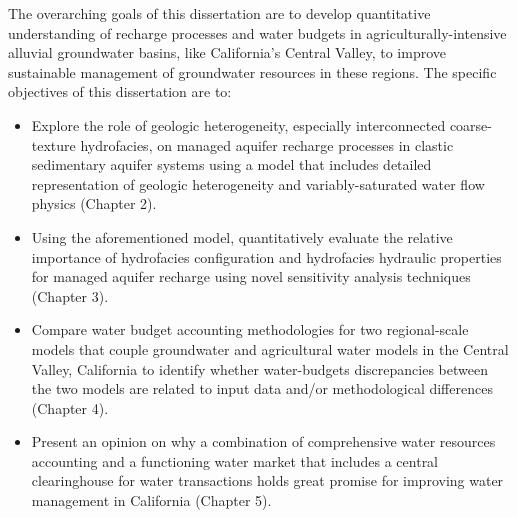 The overarching goals of this dissertation are to develop quantitative understanding of recharge processes and water budgets in agriculturally-intensive alluvial groundwater basins, like California's Central Valley, to improve sustainable management of groundwater resources in these regions. The specific objectives of this dissertation are to:

\begin{itemize}
    \item Explore the role of geologic heterogeneity, especially interconnected coarse-texture hydrofacies, on managed aquifer recharge processes in clastic sedimentary aquifer systems using a model that includes detailed representation of geologic heterogeneity and variably-saturated water flow physics (Chapter 2).
    
    \item Using the aforementioned model, quantitatively evaluate the relative importance of hydrofacies configuration and hydrofacies hydraulic properties for managed aquifer recharge using novel sensitivity analysis techniques (Chapter 3).
    
    \item Compare water budget accounting methodologies for two regional-scale models that couple groundwater and agricultural water models in the Central Valley, California to identify whether water-budgets discrepancies between the two models are related to input data and/or methodological differences (Chapter 4).
    
    \item Present an opinion on why a combination of comprehensive water resources accounting and a functioning water market that includes a central clearinghouse for water transactions holds great promise for improving water management in California (Chapter 5).
    
\end{itemize}